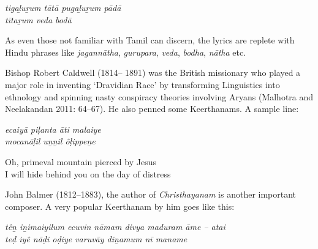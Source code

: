 \begin{myquote}
\textit{tigaḻuṟum tātā pugaḻuṟum pādā\\ tītaṟum veda bodā}
\end{myquote}

\begin{myquote}
\end{myquote}

As even those not familiar with Tamil can discern, the lyrics are replete with Hindu phrases like \textit{jagannātha}, \textit{gurupara}, \textit{veda}, \textit{bodha}, \textit{nātha} etc.

Bishop Robert Caldwell (1814– 1891) was the British missionary who played a major role in inventing ‘Dravidian Race’ by transforming Linguistics into ethnology and spinning nasty conspiracy theories involving Aryans (Malhotra and Neelakandan 2011: 64–67). He also penned some Keerthanams. A sample line:

\begin{myquote}
\textit{ecaiyā piḷanta āti malaiye\\ mocanāḷil uṉṉil ôḷippeṉe }
\end{myquote}

\begin{myquote}
\end{myquote}

\begin{myquote}
Oh, primeval mountain pierced by Jesus\\ I will hide behind you on the day of distress
\end{myquote}

John Balmer (1812–1883), the author of \textit{Christhayanam} is another important composer. A very popular Keerthanam by him goes like this:

\begin{myquote}
\textit{têṉ iṉimaiyilum ecuvin nāmam divya maduram āme – atai\\ teḍ iyê nāḍi oḍiye varuvāy diṉamum nī maname}
\end{myquote}

\begin{myquote}
\end{myquote}

